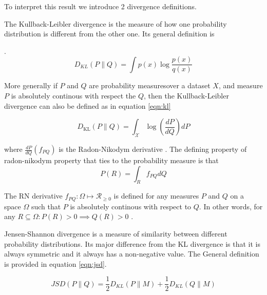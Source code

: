 To interpret this result we introduce 2 divergence definitions.
\begin{definition}
    The Kullback-Leibler divergence is the measure of how one probability distribution is different from
    the other one. Its general definition is  
\end{definition}
.
\begin{equation}
    D_{K L}(P \| Q)=\int p(x) \log \frac{p(x)}{q(x)}
\end{equation}

More generally if $P$ and $Q$ are probability measures\footnotemark  over a dataset $X$, and measure
$P$ is absolutely continous with respect the $Q$, then the Kullback-Leibler divergence can also be
defined as in equation \ref{eqn:kl}


\begin{equation}
    \label{eqn:kl}
    D_{\mathrm{KL}}(P \| Q)=\int_{\mathcal{X}} \log \left(\frac{d P}{d Q}\right) d P
\end{equation}

where $\frac{d P}{dQ} (f_{PQ})$ is the Radon-Nikodym derivative \cite{Bill86}. The defining property of
radon-nikodym property that ties to the probability measure is that 
\begin{equation}
    \label{eqn:radon}
    P(R) = \int_{R} f_{PQ} d Q
\end{equation}

The RN derivative $f_{PQ} : \Omega \mapsto \mathcal{R}_{\geq 0}$ is defined for any measures $P$ and
$Q$ on a space $\Omega$ such that $P$ is absolutely continous with respect to $Q$. In other words,
for any $ R \subseteq  \Omega : P(R) > 0 \implies Q(R) > 0$ . \cite{Bill86}

\begin{definition}
    
Jensen-Shannon divergence is a measure of similarity between different probability
distributions. Its major difference from the KL divergence is that it is always symmetric and it
always has a non-negative value. The General definition is provided in equation \ref{eqn:jsd}.
\end{definition}

\begin{equation}
    \label{eqn:jsd}
    J S D(P \| Q)=\frac{1}{2} D_{K L}(P \| M)+\frac{1}{2} D_{K L}(Q \| M)
\end{equation}


